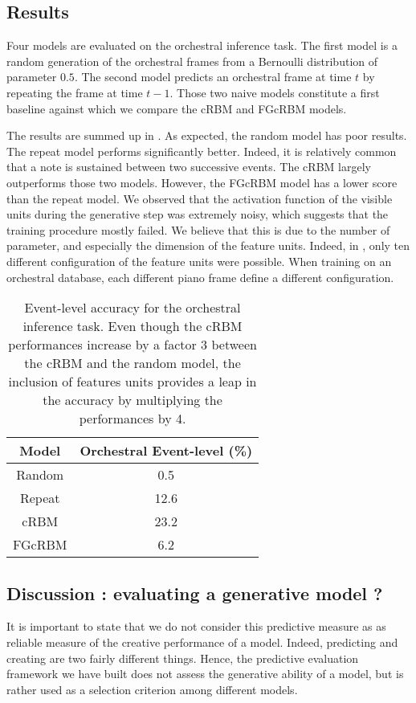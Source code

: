 \documentclass{amsart}
\begin{document}
	\subsection{Results}
	Four models are evaluated on the orchestral inference task. The first model is a random generation of the orchestral frames from a Bernoulli distribution of parameter $0.5$. The second model predicts an orchestral frame at time $t$ by repeating the frame at time $t-1$. Those two naive models constitute a first baseline against which we compare the cRBM and FGcRBM models.
	
	The results are summed up in . As expected, the random model has poor results. The repeat model performs significantly better. Indeed, it is relatively common that a note is sustained between two successive events. The cRBM largely outperforms those two models. However, the FGcRBM model has a lower score than the repeat model. We observed that the activation function of the visible units during the generative step was extremely noisy, which suggests that the training procedure mostly failed. We believe that this is due to the number of parameter,  and especially the dimension of the feature units. Indeed, in \cite{taylor2009factored}, only ten different configuration of the feature units were possible. When training on an orchestral database,  each different piano frame define a different configuration.
	
	\begin{table}[h]
		\centering
		\begin{tabular}{c c}
			\hline
			Model & Orchestral Event-level (\%)\\
			\hline
			Random & 0.5\\ 
			Repeat & 12.6\\
			\hline \hline
			cRBM & 23.2\\ 
			FGcRBM & 6.2\\ 
		\end{tabular}
		\caption{Event-level accuracy for the orchestral inference task. Even though the cRBM performances increase by a factor 3 between the cRBM and the random model, the inclusion of features units provides a leap in the accuracy by multiplying the performances by 4.}
		\label{tab:result_event_level}
	\end{table}
	
	\subsection{Discussion : evaluating a generative model ?}
	It is important to state that we do not consider this predictive measure as as reliable measure of the creative performance of a model. Indeed, predicting and creating are two fairly different things. 
	Hence, the predictive evaluation framework we have built does not assess the generative ability of a model, but is rather used as a selection criterion among different models.
	
\end{document}
